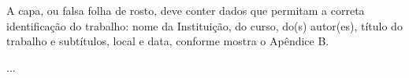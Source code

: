 \documentclass[a4paper,12pt]{article}  %
\begin{document}
\begin{ElementosTextuais}
\begin{Desenvolvimento}
A capa, ou falsa folha de rosto, deve conter dados que permitam a correta identificação do trabalho: nome da Instituição, do curso, do(s) autor(es), título do trabalho e subtítulos, local e data, conforme mostra o Apêndice B.


\end{Desenvolvimento}

\begin{Conclusao} %

...

\end{Conclusao}

\end{ElementosTextuais}

\begin{ElementosPosTextuais}
\begin{Referencias} %
\end{Referencias}

\begin{Glossario} %
\end{Glossario}

\begin{Apendice} %
\end{Apendice}

\begin{Anexo} %
\end{Anexo}

\begin{Indice} %
\end{Indice}

\end{ElementosPosTextuais}
\end{document}
